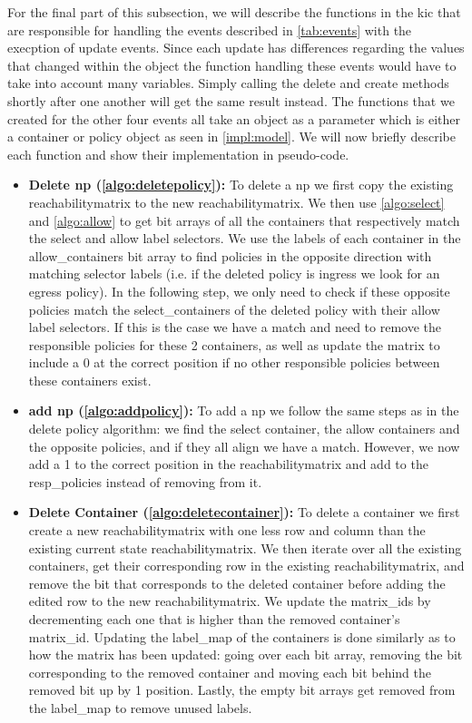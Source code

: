\newpage
For the final part of this subsection, we will describe the functions in the \acrshort{kic} that are responsible for handling the events described in \autoref{tab:events} with the execption of update events. Since each update has differences regarding the values that changed within the object the function handling these events would have to take into account many variables. Simply calling the delete and create methods shortly after one another will get the same result instead. The functions that we created for the other four events all take an object as a parameter which is either a container or policy object as seen in \autoref{impl:model}. We will now briefly describe each function and show their implementation in pseudo-code.  
\\[10pt]
\begin{itemize}
    \item \textbf{Delete \acrshort{np} (\autoref{algo:deletepolicy}):} To delete a \acrshort{np} we first copy the existing reachabilitymatrix to the new reachabilitymatrix. We then use \autoref{algo:select} and \autoref{algo:allow} to get bit arrays of all the containers that respectively match the select and allow label selectors. We use the labels of each container in the allow\_containers bit array to find policies in the opposite direction with matching selector labels (i.e. if the deleted policy is ingress we look for an egress policy). In the following step, we only need to check if these opposite policies match the select\_containers of the deleted policy with their allow label selectors. If this is the case we have a match and need to remove the responsible policies for these 2 containers, as well as update the matrix to include a 0 at the correct position if no other responsible policies between these containers exist.
    
    \item \textbf{add \acrshort{np} (\autoref{algo:addpolicy}):} To add a \acrshort{np} we follow the same steps as in the delete policy algorithm: we find the select container, the allow containers and the opposite policies, and if they all align we have a match. However, we now add a 1 to the correct position in the reachabilitymatrix and add to the resp\_policies instead of removing from it.
    
    \item \textbf{Delete Container (\autoref{algo:deletecontainer}):} To delete a container we first create a new reachabilitymatrix with one less row and column than the existing current state reachabilitymatrix. We then iterate over all the existing containers, get their corresponding row in the existing reachabilitymatrix, and remove the bit that corresponds to the deleted container before adding the edited row to the new reachabilitymatrix. We update the matrix\_ids by decrementing each one that is higher than the removed container's matrix\_id. Updating the label\_map of the containers is done similarly as to how the matrix has been updated: going over each bit array, removing the bit corresponding to the removed container and moving each bit behind the removed bit up by 1 position. Lastly, the empty bit arrays get removed from the label\_map to remove unused labels.
    

\end{itemize}
